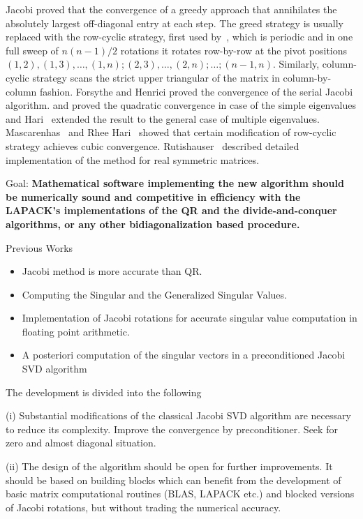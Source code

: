 \documentclass{article}
\begin{document}
Jacobi proved that the convergence of a greedy approach that annihilates
the absolutely largest off-diagonal entry at each step. The greed strategy
is usually replaced with the row-cyclic strategy, first used
by~\cite{greg53}, which is periodic and in one full sweep of $n(n-1)/2$
rotations it rotates row-by-row at the pivot positions
$(1,2),(1,3),\dots,(1,n); (2,3),\dots,(2,n); \dots; (n-1,n)$. Similarly,
column-cyclic strategy scans the strict upper triangular of the matrix in
column-by-column fashion. Forsythe and Henrici \cite{fohe60} proved the
convergence of the serial Jacobi algorithm. \cite{scho61} and \cite{wilk62}
proved the quadratic convergence in case of the simple eigenvalues and
Hari~\cite{hari91} extended the result to the general case of multiple
eigenvalues. Mascarenhas~\cite{masc95} and Rhee Hari~\cite{rhha93} showed
that certain modification of row-cyclic strategy achieves cubic
convergence. Rutishauser~\cite{ruti66} described detailed implementation of
the method for real symmetric matrices.

Goal: \bf{Mathematical software implementing the new algorithm should be
  numerically sound and competitive in efficiency with the LAPACK's
  implementations of the QR and the divide-and-conquer algorithms, or any
  other bidiagonalization based procedure.}

Previous Works
\begin{itemize}
 \item Jacobi method is more accurate than QR. \cite{deve92} 
 \item Computing the Singular and the Generalized Singular Values.
   \cite{drma94_PHD} 
\item Implementation of Jacobi rotations for accurate singular value
  computation in floating point arithmetic. \cite{drma97}
\item A posteriori computation of the singular vectors in a preconditioned
  Jacobi SVD algorithm \cite{drma99} 
\end{itemize}

The development is divided into the following 

(i) Substantial modifications of the classical Jacobi SVD algorithm are
necessary to reduce its complexity. Improve the convergence by
preconditioner. Seek for zero and almost diagonal situation.

(ii) The design of the algorithm should be open for further improvements.
It should be based on building blocks which can benefit from the
development of basic matrix computational routines (BLAS, LAPACK etc.) and
blocked versions of Jacobi rotations, but without trading the numerical
accuracy. 
\end{document}
